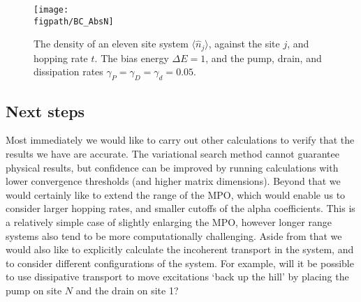 \begin{figure}[ht!]
	\centering
	\texttt{[image: \\figpath/BC\_AbsN]}
	\caption{\label{fig:fw1-3}The density of an eleven site system \(\langle \hat{n}_{j} \rangle\), against the site \(j\), and hopping rate \(t\). The bias energy \(\Delta E = 1\), and the pump, drain, and dissipation rates \(\gamma_{P} = \gamma_{D} = \gamma_{d} = 0.05\).}
\end{figure}

\subsection{Next steps}
Most immediately we would like to carry out other calculations to verify that the results we have are accurate. The variational search method cannot guarantee physical results, but confidence can be improved by running calculations with lower convergence thresholds (and higher matrix dimensions). Beyond that we would certainly like to extend the range of the MPO, which would enable us to consider larger hopping rates, and smaller cutoffs of the alpha coefficients. This is a relatively simple case of slightly enlarging the MPO, however longer range systems also tend to be more computationally challenging. Aside from that we would also like to explicitly calculate the incoherent transport in the system, and to consider different configurations of the system. For example, will it be possible to use dissipative transport to move excitations `back up the hill' by placing the pump on site \(N\) and the drain on site 1?


